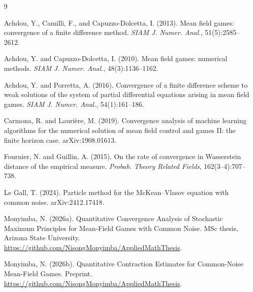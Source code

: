 \documentclass[11pt]{article}
\theoremstyle{remark}
\begin{document}

\begin{thebibliography}{9}

Achdou, Y., Camilli, F., and Capuzzo-Dolcetta, I. (2013).
\newblock Mean field games: convergence of a finite difference method.
\newblock \emph{SIAM J. Numer. Anal.}, 51(5):2585--2612.

Achdou, Y. and Capuzzo-Dolcetta, I. (2010).
\newblock Mean field games: numerical methods.
\newblock \emph{SIAM J. Numer. Anal.}, 48(3):1136--1162.

Achdou, Y. and Porretta, A. (2016).
\newblock Convergence of a finite difference scheme to weak solutions of the
system of partial differential equations arising in mean field games.
\newblock \emph{SIAM J. Numer. Anal.}, 54(1):161--186.

Carmona, R. and Lauri\`ere, M. (2019).
\newblock Convergence analysis of machine learning algorithms for the
numerical solution of mean field control and games II: the finite horizon
case.
\newblock arXiv:1908.01613.

Fournier, N. and Guillin, A. (2015).
\newblock On the rate of convergence in Wasserstein distance of the empirical
measure.
\newblock \emph{Probab. Theory Related Fields}, 162(3--4):707--738.

Le Gall, T. (2024).
\newblock Particle method for the McKean--Vlasov equation with common noise.
\newblock arXiv:2412.17418.

Monyimba, N. (2026a).
\newblock Quantitative Convergence Analysis of Stochastic Maximum Principles for
Mean-Field Games with Common Noise.
\newblock MSc thesis, Arizona State University.
\newblock \url{https://github.com/NisongMonyimba/AppliedMathThesis}.

Monyimba, N. (2026b).
\newblock Quantitative Contraction Estimates for Common-Noise Mean-Field Games.
\newblock Preprint.
\newblock \url{https://github.com/NisongMonyimba/AppliedMathThesis}.

\end{thebibliography}
\end{document}
